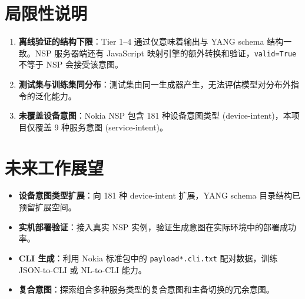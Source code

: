 \documentclass[12pt, a4paper]{article}
\newcommand{\yang}{\textsc{YANG}}
\newcommand{\nsp}{\textsc{NSP}}
\begin{document}
\section{局限性说明}
\label{sec:limitations}

\begin{enumerate}
  \item \textbf{离线验证的结构下限}：Tier 1--4 通过仅意味着输出与 \yang{} schema 结构一致。\nsp{} 服务器端还有 JavaScript 映射引擎的额外转换和验证，\texttt{valid=True} 不等于 \nsp{} 会接受该意图。
  \item \textbf{测试集与训练集同分布}：测试集由同一生成器产生，无法评估模型对分布外指令的泛化能力。
  \item \textbf{未覆盖设备意图}：Nokia \nsp{} 包含 181 种设备意图类型 (device-intent)，本项目仅覆盖 9 种服务意图 (service-intent)。
\end{enumerate}

\section{未来工作展望}

\begin{itemize}
  \item \textbf{设备意图类型扩展}：向 181 种 device-intent 扩展，\yang{} schema 目录结构已预留扩展空间。
  \item \textbf{实机部署验证}：接入真实 \nsp{} 实例，验证生成意图在实际环境中的部署成功率。
  \item \textbf{CLI 生成}：利用 Nokia 标准包中的 \texttt{payload*.cli.txt} 配对数据，训练 JSON-to-CLI 或 NL-to-CLI 能力。
  \item \textbf{复合意图}：探索组合多种服务类型的复合意图和主备切换的冗余意图。
\end{itemize}
\end{document}
